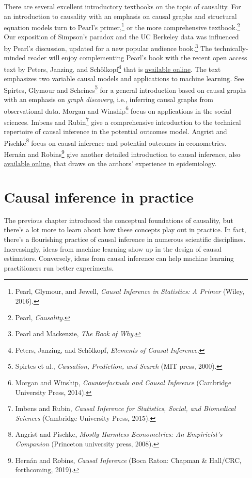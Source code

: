 \documentclass{tufte-book}
\begin{document}
There are several excellent introductory textbooks on the topic of
causality. For an introduction to causality with an emphasis on causal
graphs and structural equation models turn to Pearl's primer,\footnote{Pearl,
  Glymour, and Jewell, \emph{Causal Inference in Statistics: A Primer}
  (Wiley, 2016).} or the more comprehensive textbook.\footnote{Pearl,
  \emph{Causality}.} Our exposition of Simpson's paradox and the UC
Berkeley data was influenced by Pearl's discussion, updated for a new
popular audience book.\footnote{Pearl and Mackenzie, \emph{The Book of
  Why}.} The technically-minded reader will enjoy complementing Pearl's
book with the recent open access text by Peters, Janzing, and
Schölkopf\footnote{Peters, Janzing, and Schölkopf, \emph{Elements of
  Causal Inference}.} that is
\href{https://mitpress.mit.edu/books/elements-causal-inference}{available
online}. The text emphasizes two variable causal models and applications
to machine learning. See Spirtes, Glymour and Scheines\footnote{Spirtes
  et al., \emph{Causation, Prediction, and Search} (MIT press, 2000).}
for a general introduction based on causal graphs with an emphasis on
\emph{graph discovery}, i.e., inferring causal graphs from observational
data. Morgan and Winship\footnote{Morgan and Winship,
  \emph{Counterfactuals and Causal Inference} (Cambridge University
  Press, 2014).} focus on applications in the social sciences. Imbens
and Rubin\footnote{Imbens and Rubin, \emph{Causal Inference for
  Statistics, Social, and Biomedical Sciences} (Cambridge University
  Press, 2015).} give a comprehensive introduction to the technical
repertoire of causal inference in the potential outcomes model. Angrist
and Pischke\footnote{Angrist and Pischke, \emph{Mostly Harmless
  Econometrics: An Empiricist's Companion} (Princeton university press,
  2008).} focus on causal inference and potential outcomes in
econometrics. Hernán and Robins\footnote{Hernán and Robins, \emph{Causal
  Inference} (Boca Raton: Chapman \& Hall/CRC, forthcoming, 2019).} give
another detailed introduction to causal inference, also
\href{https://www.hsph.harvard.edu/miguel-hernan/causal-inference-book/}{available
online}, that draws on the authors' experience in epidemiology.

\chapter{Causal inference in practice}

The previous chapter introduced the conceptual foundations of causality,
but there's a lot more to learn about how these concepts play out in
practice. In fact, there's a flourishing practice of causal inference in
numerous scientific disciplines. Increasingly, ideas from machine
learning show up in the design of causal estimators. Conversely, ideas
from causal inference can help machine learning practitioners run better
experiments.
\end{document}

